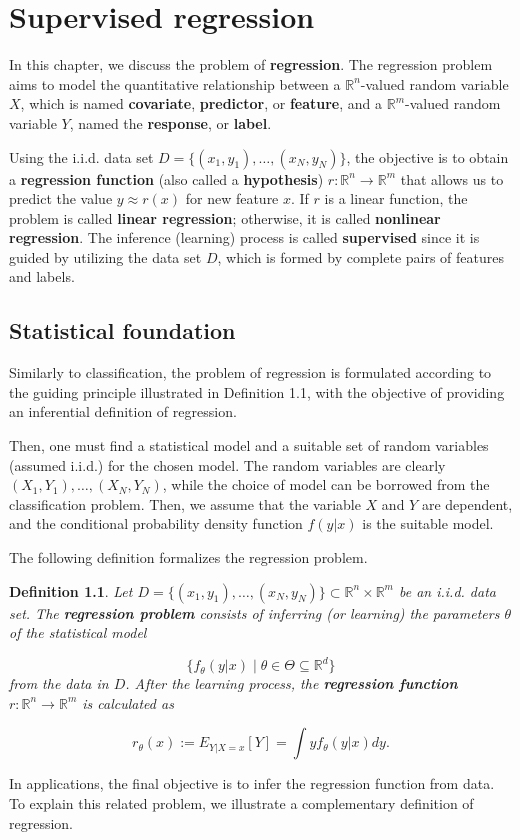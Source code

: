 \documentclass{report}
\newtheorem{definition}{Definition}[chapter]
\begin{document}
\chapter{Supervised regression}
In this chapter, we discuss the problem of \textbf{regression}. The regression problem aims to model the quantitative relationship between a $\mathbb{R}^n$-valued random variable $X$, which is named \textbf{covariate}, \textbf{predictor}, or \textbf{feature}, and a $\mathbb{R}^m$-valued random variable $Y$, named the \textbf{response}, or \textbf{label}.

Using the i.i.d. data set $D = \{(x_1,y_1),\dots,(x_N,y_N)\}$, the objective is to obtain a \textbf{regression function} (also called a \textbf{hypothesis}) $r : \mathbb{R}^n \to \mathbb{R}^m$ that allows us to predict the value $y \approx r(x)$ for new feature $x$. If $r$ is a linear function, the problem is called \textbf{linear regression}; otherwise, it is called \textbf{nonlinear regression}. The inference (learning) process is called \textbf{supervised} since it is guided by utilizing the data set $D$, which is formed by complete pairs of features and labels.

\section{Statistical foundation}
Similarly to classification, the problem of regression is formulated according to the guiding principle illustrated in Definition 1.1, with the objective of providing an inferential definition of regression.

Then, one must find a statistical model and a suitable set of random variables (assumed i.i.d.) for the chosen model. The random variables are clearly $(X_1,Y_1),\dots,(X_N,Y_N)$, while the choice of model can be borrowed from the classification problem. Then, we assume that the variable $X$ and $Y$ are dependent, and the conditional probability density function $f(y|x)$ is the suitable model.

The following definition formalizes the regression problem.

\begin{definition}
Let $D = \{(x_1,y_1),\dots,(x_N,y_N)\} \subset \mathbb{R}^n \times \mathbb{R}^m$ be an i.i.d. data set. The \textbf{regression problem} consists of inferring (or learning) the parameters $\theta$ of the statistical model

\begin{equation}
\{f_\theta(y|x) \mid \theta \in \Theta \subseteq \mathbb{R}^d\}
\end{equation}
from the data in $D$. After the learning process, the \textbf{regression function} $r : \mathbb{R}^n \to \mathbb{R}^m$ is calculated as

\begin{equation}
r_\theta(x) := E_{Y|X = x}[Y] = \int yf_\theta(y|x)dy.
\end{equation}
\end{definition}
In applications, the final objective is to infer the regression function from data. To explain this related problem, we illustrate a complementary definition of regression.
\end{document}
